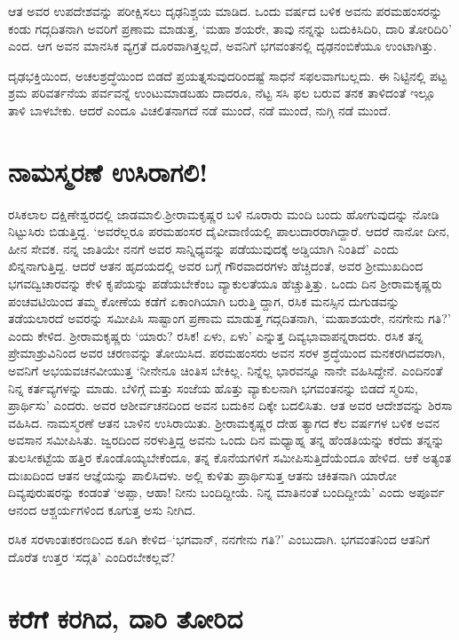 ಆತ ಅವರ ಉಪದೇಶವನ್ನು ಪರೀಕ್ಷಿಸಲು ದೃಢನಿಶ್ಚಯ ಮಾಡಿದ. ಒಂದು ವರ್ಷದ ಬಳಿಕ ಅವನು ಪರಮಹಂಸರನ್ನು ಕಂಡು ಗದ್ಗದಿತನಾಗಿ ಅವರಿಗೆ ಪ್ರಣಾಮ ಮಾಡುತ್ತ, ‘ಮಹಾ ಶಯರೇ, ತಾವು ನನ್ನನ್ನು ಬದುಕಿಸಿದಿರಿ, ದಾರಿ ತೋರಿದಿರಿ’ ಎಂದ. ಆಗ ಅವನ ಮಾನಸಿಕ ವ್ಯಗ್ರತೆ ದೂರವಾಗಿತ್ತಲ್ಲದೆ, ಅವನಿಗೆ ಭಗವಂತನಲ್ಲಿ ದೃಢನಂಬಿಕೆಯೂ ಉಂಟಾಗಿತ್ತು.

ದೃಢಭಕ್ತಿಯಿಂದ, ಅಚಲಶ್ರದ್ಧೆಯಿಂದ ಬಿಡದೆ ಪ್ರಯತ್ನಸುವುದರಿಂದಷ್ಟೆ ಸಾಧನೆ ಸಫಲವಾಗಬಲ್ಲದು. ಈ ನಿಟ್ಟಿನಲ್ಲಿ ಪಟ್ಟ ಶ್ರಮ ಪರಿವರ್ತನೆಯ ಪರ್ವವನ್ನೆ ಉಂಟುಮಾಡಬಹು ದಾದರೂ, ನೆಟ್ಟ ಸಸಿ ಫಲ ಬರುವ ತನಕ ತಾಳಿದಂತೆ ಇಲ್ಲೂ ತಾಳಿ ಬಾಳಬೇಕು. ಆದರೆ ಎಂದೂ ವಿಚಲಿತನಾಗದೆ ನಡೆ ಮುಂದೆ, ನಡೆ ಮುಂದೆ, ನುಗ್ಗಿ ನಡೆ ಮುಂದೆ.


\section{ನಾಮಸ್ಮರಣೆ ಉಸಿರಾಗಲಿ!}

ರಸಿಕಲಾಲ ದಕ್ಷಿಣೇಶ್ವರದಲ್ಲಿ ಜಾಡಮಾಲಿ.ಶ‍್ರೀರಾಮಕೃಷ್ಣರ ಬಳಿ ನೂರಾರು ಮಂದಿ ಬಂದು ಹೋಗುವುದನ್ನು ನೋಡಿ ನಿಟ್ಟುಸಿರು ಬಿಡುತ್ತಿದ್ದ. ‘ಅವರೆಲ್ಲರೂ ಪರಮಹಂಸರ ದೈವೀವಾಣಿಯಲ್ಲಿ ಪಾಲುದಾರರಾಗಿದ್ದಾರೆ. ಆದರೆ ನಾನೋ ದೀನ, ಹೀನ ಸೇವಕ. ನನ್ನ ಜಾತಿಯೇ ನನಗೆ ಅವರ ಸಾನ್ನಿಧ್ಯವನ್ನು ಪಡೆಯುವುದಕ್ಕೆ ಅಡ್ಡಿಯಾಗಿ ನಿಂತಿದೆ’ ಎಂದು ಖಿನ್ನನಾಗುತ್ತಿದ್ದ. ಆದರೆ ಆತನ ಹೃದಯದಲ್ಲಿ ಅವರ ಬಗ್ಗೆ ಗೌರವಾದರಗಳು ಹೆಚ್ಚಿದಂತೆ, ಅವರ ಶ‍್ರೀಮುಖದಿಂದ ಭಗವದ್ವಿಚಾರವನ್ನು ಕೇಳಿ ಕೃಪೆಯನ್ನು ಪಡೆಯಬೇಕೆಂಬ ವ್ಯಾಕುಲತೆಯೂ ಹೆಚ್ಚುತ್ತಿತ್ತು. ಒಂದು ದಿನ ಶ‍್ರೀರಾಮಕೃಷ್ಣರು ಪಂಚವಟಿಯಿಂದ ತಮ್ಮ ಕೋಣೆಯ ಕಡೆಗೆ ಏಕಾಂಗಿಯಾಗಿ ಬರುತ್ತಿ ದ್ದಾಗ, ರಸಿಕ ಮನಸ್ಸಿನ ದುಗುಡವನ್ನು ತಡೆಯಲಾರದೆ ಅವರನ್ನು ಸಮೀಪಿಸಿ ಸಾಷ್ಟಾಂಗ ಪ್ರಣಾಮ ಮಾಡುತ್ತ ಗದ್ಗದಿತನಾಗಿ, ‘ಮಹಾಶಯರೇ, ನನಗೇನು ಗತಿ?’ ಎಂದು ಕೇಳಿದ. ಶ‍್ರೀರಾಮಕೃಷ್ಣರು ‘ಯಾರು? ರಸಿಕ! ಏಳು, ಏಳು’ ಎನ್ನುತ್ತ ದಿವ್ಯಭಾವಾಪನ್ನರಾದರು. ರಸಿಕ ತನ್ನ ಪ್ರೇಮಾಶ್ರುವಿನಿಂದ ಅವರ ಚರಣವನ್ನು ತೋಯಿಸಿದ. ಪರಮಹಂಸರು ಅವನ ಸರಳ ಶ್ರದ್ಧೆಯಿಂದ ಮನಕರಗಿದವರಾಗಿ, ಅವನಿಗೆ ಅಭಯವಚನವೀಯುತ್ತ ‘ನೀನೇನೂ ಚಿಂತಿಸ ಬೇಕಿಲ್ಲ. ನಿನ್ನೆಲ್ಲ ಭಾರವನ್ನೂ ನಾನೇ ವಹಿಸಿದ್ದೇನೆ. ಎಂದಿನಂತೆ ನಿನ್ನ ಕರ್ತವ್ಯಗಳನ್ನು ಮಾಡು. ಬೆಳಿಗ್ಗೆ ಮತ್ತು ಸಂಜೆಯ ಹೊತ್ತು ವ್ಯಾಕುಲನಾಗಿ ಭಗವಂತನನ್ನು ಬಿಡದೆ ಸ್ಮರಿಸು, ಪ್ರಾರ್ಥಿಸು’ ಎಂದರು. ಅವರ ಆಶೀರ್ವಚನದಿಂದ ಅವನ ಬದುಕಿನ ದಿಕ್ಕೇ ಬದಲಿಸಿತು. ಆತ ಅವರ ಆದೇಶವನ್ನು ಶಿರಸಾ ವಹಿಸಿದ. ನಾಮಸ್ಮರಣೆ ಆತನ ಬಾಳಿನ ಉಸಿರಾಯಿತು. ಶ‍್ರೀರಾಮಕೃಷ್ಣರ ದೇಹ ತ್ಯಾಗದ ಕೆಲ ವರ್ಷಗಳ ಬಳಿಕ ಅವನ ಅವಸಾನ ಸಮೀಪಿಸಿತು. ಜ್ವರದಿಂದ ನರಳುತ್ತಿದ್ದ ಅವನು ಒಂದು ದಿನ ಮಧ್ಯಾಹ್ನ ತನ್ನ ಹೆಂಡತಿಯನ್ನು ಕರೆದು ತನ್ನನ್ನು ತುಲಸೀಕಟ್ಟೆಯ ಹತ್ತಿರ ಕೊಂಡೊಯ್ಯಬೇಕೆಂದೂ, ತನ್ನ ಕೊನೆಯಗಳಿಗೆ ಸಮೀಪಿಸುತ್ತಿದೆಯೆಂದೂ ಹೇಳಿದ. ಆಕೆ ಅತ್ಯಂತ ದುಃಖದಿಂದ ಆತನ ಆಜ್ಞೆಯನ್ನು ಪಾಲಿಸಿದಳು. ಅಲ್ಲಿ ಕುಳಿತು ಪ್ರಾರ್ಥಿಸುತ್ತ ಆತನು ಚಕಿತನಾಗಿ ಯಾರೋ ದಿವ್ಯಪುರುಷರನ್ನು ಕಂಡಂತೆ ‘ಅಪ್ಪಾ, ಆಹಾ! ನೀನು ಬಂದಿದ್ದೀಯೆ. ನಿನ್ನ ಮಾತಿನಂತೆ ಬಂದಿದ್ದೀಯೆ’ ಎಂದು ಅಪೂರ್ವ ಆನಂದ ಆಶ್ಚರ್ಯಗಳಿಂದ ಕೂಗುತ್ತ ಅಸು ನೀಗಿದ.

ರಸಿಕ ಸರಳಾಂತಃಕರಣದಿಂದ ಕೂಗಿ ಕೇಳಿದ–‘ಭಗವಾನ್, ನನಗೇನು ಗತಿ?’ ಎಂಬುದಾಗಿ. ಭಗವಂತನಿಂದ ಆತನಿಗೆ ದೊರೆತ ಉತ್ತರ ‘ಸದ್ಗತಿ’ ಎಂದಿರಬೇಕಲ್ಲವೆ?


\section{ಕರೆಗೆ ಕರಗಿದ, ದಾರಿ ತೋರಿದ}

